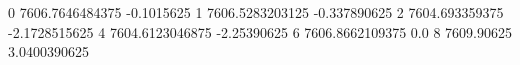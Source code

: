 0 7606.7646484375 -0.1015625
1 7606.5283203125 -0.337890625
2 7604.693359375 -2.1728515625
4 7604.6123046875 -2.25390625
6 7606.8662109375 0.0
8 7609.90625 3.0400390625

